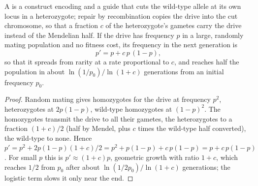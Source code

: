\begin{theorem}\label{thm:b3:genetic-engineering:drive}
A \emph{} is a construct encoding  and a guide that cuts
the wild-type allele at its own locus in a heterozygote; repair by
recombination copies the drive into the cut chromosome, so that a
fraction $c$ of the heterozygote's gametes carry the drive instead of
the Mendelian half. If the drive has frequency $p$ in a large,
randomly mating population and no fitness cost, its frequency in the
next generation is
\[
p' = p + c\,p\,(1 - p),
\]
so that it spreads from rarity at a rate proportional to $c$, and
reaches half the population in about $\ln(1/p_{0})/\ln(1 + c)$
generations from an initial frequency $p_{0}$.
\end{theorem}
\begin{proof}
Random mating gives homozygotes for the drive at frequency $p^{2}$,
heterozygotes at $2p(1-p)$, wild-type homozygotes at $(1-p)^{2}$. The
homozygotes transmit the drive to all their gametes, the heterozygotes
to a fraction $(1 + c)/2$ (half by Mendel, plus $c$ times the wild-type
half converted), the wild-type to none. Hence $p' = p^{2} + 2p(1-p)(1+c)/2
= p^{2} + p(1-p) + c\,p(1-p) = p + c\,p(1-p)$. For small $p$ this is
$p' \approx (1+c)p$, geometric growth with ratio $1 + c$, which reaches
$1/2$ from $p_{0}$ after about $\ln(1/2p_{0})/\ln(1+c)$ generations; the
logistic term slows it only near the end.
\end{proof}

